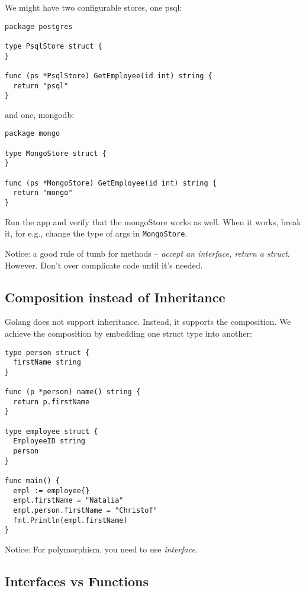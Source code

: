 \documentclass[11pt, letterpaper]{article}
\begin{document}
We might have two configurable stores, one psql:

\begin{verbatim}
package postgres

type PsqlStore struct {
}

func (ps *PsqlStore) GetEmployee(id int) string {
  return "psql"
}
\end{verbatim}

and one, mongodb:

\begin{verbatim}
package mongo

type MongoStore struct {
}

func (ps *MongoStore) GetEmployee(id int) string {
  return "mongo"
}
\end{verbatim}

Run the app and verify that the mongoStore works as well. When it works, break it, for e.g., change the type of args in \texttt{MongoStore}.

\bigskip
Notice: a good rule of tumb for methods -- \emph{accept an interface, return a struct}. However. Don’t over complicate code until it’s needed.

\subsection{Composition instead of Inheritance}

Golang does not support inheritance. Instead, it supports the composition. We achieve the composition by embedding one struct type into another:

\begin{verbatim}
type person struct {
  firstName string
}

func (p *person) name() string {
  return p.firstName
}

type employee struct {
  EmployeeID string
  person
}

func main() {
  empl := employee{}
  empl.firstName = "Natalia"
  empl.person.firstName = "Christof"
  fmt.Println(empl.firstName)
}
\end{verbatim}

Notice: For polymorphism, you need to use \emph{interface}.

\subsection{Interfaces vs Functions}
\end{document}
